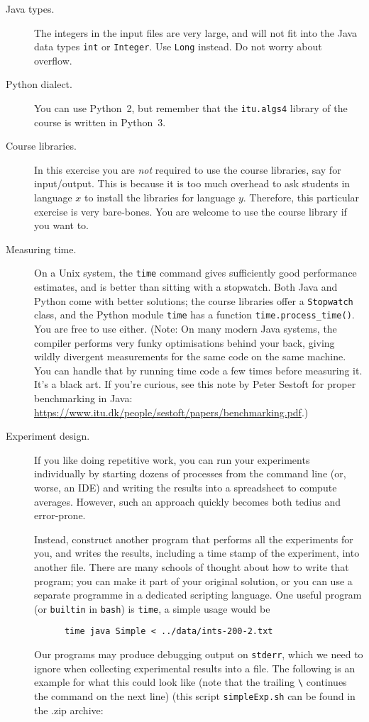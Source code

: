 \documentclass{tufte-handout}
\begin{document}
\begin{description}
  \item[Java types.] The integers in the input files are very large, and will not fit into the Java data types \texttt{int} or \texttt{Integer}.
    Use \texttt{Long} instead.
    Do not worry about overflow.
  \item[Python dialect.] You can use Python~2, but remember that the \texttt{itu.algs4} library of the course is written in Python~3.
  \item[Course libraries.]
    In this exercise you are \emph{not} required to use the course libraries, say for input/output.
    This is because it is too much overhead to ask students in language $x$ to install the libraries for language $y$.
    Therefore, this particular exercise is very bare-bones.
    You are welcome to use the course library if you want to.
  \item[Measuring time.]
    On a Unix system, the \texttt{time} command gives sufficiently good performance estimates, and is better than sitting with a stopwatch.
    Both Java and Python come with better solutions; the course libraries offer a \texttt{Stopwatch} class, and the Python module \texttt{time} has a function \texttt{time.process\_time()}. You are free to use either. 
    (Note: On many modern Java systems, the compiler performs very funky
    optimisations behind your back, giving wildly divergent measurements for
    the same code on the same machine.  You can handle that by running time
    code a few times before measuring it.  It's a black art.  If you're
    curious, see this note by Peter Sestoft for proper benchmarking in Java:
    \url{https://www.itu.dk/people/sestoft/papers/benchmarking.pdf}.)
  \item[Experiment design.]
    If you like doing repetitive work, you  can run your experiments individually by starting dozens of processes from the command line (or, worse, an IDE) and writing the results into a spreadsheet to compute averages.
    However, such an approach quickly becomes both tedius and error-prone.

    Instead, construct another program that performs all the experiments for you, and writes the results, including a time stamp of the experiment, into another file.
    There are many schools of thought about how to write that program; you can make it part of your original solution, or you can use a separate programme in a dedicated scripting language.
    One useful program (or \texttt{builtin} in \texttt{bash}) is \texttt{time}, a simple usage would be 
    \begin{lstlisting}
      time java Simple < ../data/ints-200-2.txt
    \end{lstlisting}
    Our programs may produce debugging output on \texttt{stderr}, which we need to ignore when collecting experimental results into a file. 
    The following is an example for what this could look like (note that the trailing \verb+\+ continues the command on the next line) (this script \texttt{simpleExp.sh} can be found in the .zip archive:
    


\end{description}
\end{document}
